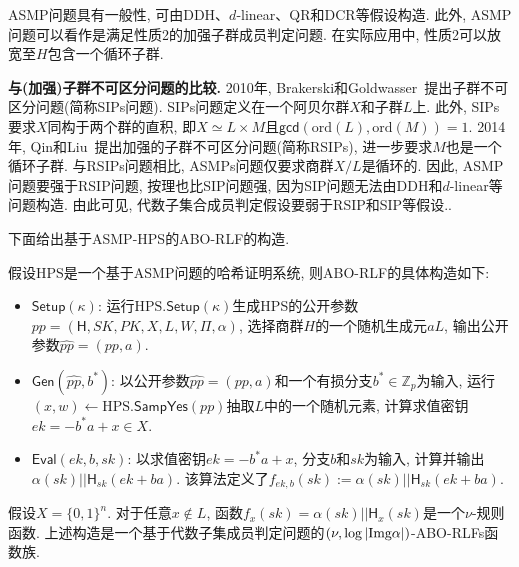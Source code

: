 \begin{remark}
ASMP问题具有一般性, 可由DDH、$d$-linear、QR和DCR等假设构造. 此外, ASMP问题可以看作是满足性质2的加强子群成员判定问题.  在实际应用中, 性质2可以放宽至$H$包含一个循环子群. 
\end{remark}

\begin{trivlist}
\item \textbf{与(加强)子群不可区分问题的比较.} 2010年, Brakerski和Goldwasser~\cite{BG-CRYPTO-2010}提出子群不可区分问题(简称SIPs问题). SIPs问题定义在一个阿贝尔群$X$和子群$L$上. 此外, SIPs要求$X$同构于两个群的直积, 即$X \simeq L \times M$且$\mathsf{gcd}(\text{ord}(L), \text{ord}(M)) = 1$. 2014年, Qin和Liu~\cite{Qin-PKC-2014}提出加强的子群不可区分问题(简称RSIPs), 进一步要求$M$也是一个循环子群. 与RSIPs问题相比, ASMPs问题仅要求商群$X/L$是循环的. 因此, ASMP问题要强于RSIP问题, 按理也比SIP问题强, 因为SIP问题无法由DDH和$d$-linear等问题构造. 由此可见, 代数子集合成员判定假设要弱于RSIP和SIP等假设..    
\end{trivlist}

下面给出基于ASMP-HPS的ABO-RLF的构造. 
\begin{construction}
假设HPS是一个基于ASMP问题的哈希证明系统, 则ABO-RLF的具体构造如下:   
\begin{itemize} \itemsep 1pt \parskip 0pt \parsep 0pt
	\item $\mathsf{Setup}(\kappa)$: 运行$\text{HPS}.\mathsf{Setup}(\kappa)$生成HPS的公开参数$pp = (\mathsf{H}, SK, PK, X, L, W, \Pi, \alpha)$, 选择商群$H$的一个随机生成元$aL$, 输出公开参数$\hat{pp} = (pp, a)$.    

	\item $\mathsf{Gen}(\hat{pp}, b^*)$: 以公开参数$\hat{pp} = (pp, a)$和一个有损分支$b^* \in \mathbb{Z}_p$为输入, 
运行$(x, w) \leftarrow \text{HPS}.\mathsf{SampYes}(pp)$抽取$L$中的一个随机元素, 
计算求值密钥$ek = -b^*a + x \in X$. 

	\item $\mathsf{Eval}(ek, b, sk)$: 以求值密钥$ek = -b^*a + x$, 分支$b$和$sk$为输入, 
计算并输出$\alpha(sk)||\mathsf{H}_{sk}(ek+ba)$. 该算法定义了$f_{ek,b}(sk):= \alpha(sk)||\mathsf{H}_{sk}(ek+ba)$.  
\end{itemize}
\end{construction}
 
\begin{theorem}
假设$X = \{0,1\}^n$. 对于任意$x \notin L$, 函数$f_x(sk) = \alpha(sk)||\mathsf{H}_x(sk)$是一个$\nu$-规则函数. 上述构造是一个基于代数子集成员判定问题的$(\nu, \log |\textup{Img} \alpha|)$-ABO-RLFs函数族. 
\end{theorem}

